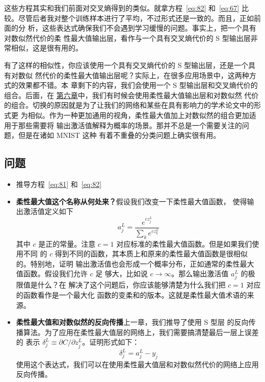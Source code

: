 这些方程其实和我们前面对交叉熵得到的类似。就拿方程~\eqref{eq:82} 和~\eqref{eq:67}
比较。尽管后者我对整个训练样本进行了平均，不过形式还是一致的。而且，正如前面的分
析，这些表达式确保我们不会遇到学习缓慢的问题。事实上，把一个具有对数似然代价的柔
性最大值输出层，看作与一个具有交叉熵代价的 S 型输出层非常相似，这是很有用的。

有了这样的相似性，你应该使用一个具有交叉熵代价的 S 型输出层，还是一个具有对数似
然代价的柔性最大值输出层呢？实际上，在很多应用场景中，这两种方式的效果都不错。本
章剩下的内容，我们会使用一个 S 型输出层和交叉熵代价的组合。后面，在%
\hyperref[ch:Deeplearning]{第六章}中，我们有时候会使用柔性最大值输出层和对数似然
代价的组合。切换的原因就是为了让我们的网络和某些在具有影响力的学术论文中的形式更
为相似。作为一种更加通用的视角，柔性最大值加上对数似然的组合更加适用于那些需要将
输出激活值解释为概率的场景。那并不总是一个需要关注的问题，但是在诸如 MNIST 这种
有着不重叠的分类问题上确实很有用。

\subsection*{问题}

\begin{itemize}
\item 推导方程~\eqref{eq:81} 和~\eqref{eq:82}
\item \textbf{柔性最大值这个名称从何处来？}\quad 假设我们改变一下柔性最大值函数，
  使得输出激活值定义如下
  \begin{equation}
    a^L_j = \frac{e^{c z^L_j}}{\sum_k e^{c z^L_k}}
    \label{eq:83}\tag{83}
  \end{equation}
  其中 $c$ 是正的常量。注意 $c=1$ 对应标准的柔性最大值函数。但是如果我们使用不同
  的 $c$ 得到不同的函数，其本质上和原来的柔性最大值函数是很相似的。特别地，证明
  输出激活值也会形成一个概率分布，正如通常的柔性最大值函数。假设我们允许 $c$ 足
  够大，比如说 $c\rightarrow \infty$。那么输出激活值 $a_j^L$ 的极限值是什么？在
  解决了这个问题后，你应该能够清楚为什么我们把 $c=1$ 对应的函数看作是一个最大化
  函数的变柔和的版本。这就是柔性最大值术语的来源。
\item \textbf{柔性最大值和对数似然的反向传播}\quad 上一章，我们推导了使用 S 型层
  的反向传播算法。为了应用在柔性最大值层的网络上，我们需要搞清楚最后一层上误差的
  表示 $\delta^L_j \equiv \partial C / \partial z^L_j$。证明形式如下：
  \begin{equation}
    \delta^L_j = a^L_j -y_j
    \label{eq:84}\tag{84}
  \end{equation}
  使用这个表达式，我们可以在使用柔性最大值层和对数似然代价的网络上应用反向传播。
\end{itemize}

